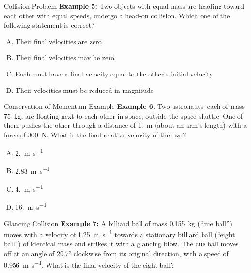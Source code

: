 \documentclass[12pt,compress,aspectratio=169]{beamer}
\begin{document}
\begin{frame}{Collision Problem}
  \textbf{Example 5:} Two objects with equal mass are heading toward each
  other with equal speeds, undergo a head-on collision. Which one of the
  following statement is correct?

  \vspace{.15in}\begin{enumerate}[A.]
  \item Their final velocities are zero
  \item Their final velocities may be zero
  \item Each must have a final velocity equal to the other's initial velocity
  \item Their velocities must be reduced in magnitude
  \end{enumerate}
\end{frame}



\begin{frame}{Conservation of Momentum Example}
  \textbf{Example 6:} Two astronauts, each of mass \SI{75}{\kilo\gram}, are
  floating next to each other in space, outside the space shuttle. One of them
  pushes the other through a distance of \SI{1.}{\metre} (about an arm's
  length) with a force of \SI{300}{\newton}. What is the final relative
  velocity of the two?

  \vspace{.15in}\begin{enumerate}[A.]
  \item \SI{2.}{\metre\per\second}
  \item \SI{2.83}{\metre\per\second}
  \item \SI{4.}{\metre\per\second}
  \item \SI{16.}{\metre\per\second}
  \end{enumerate}
\end{frame}



\begin{frame}{Glancing Collision}
  \vspace{.3in}\textbf{Example 7:} A billiard ball of mass \SI{.155}{\kilo\gram}
  (``cue ball'') moves with a velocity of \SI{1.25}{\metre\per\second} towards
  a stationary billiard ball (``eight ball'') of identical mass and strikes it
  with a glancing blow. The cue ball moves off at an angle of \ang{29.7}
  clockwise from its original direction, with a speed of
  \SI{.956}{\metre\per\second}. What is the final velocity of the eight ball?
\end{frame}
\end{document}
